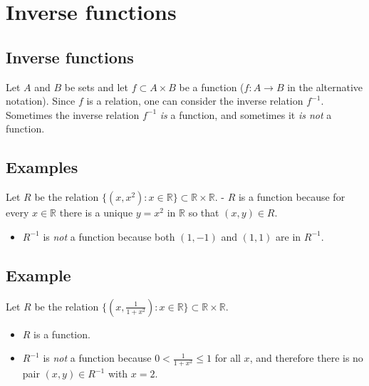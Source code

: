\documentclass[
]{article}
\author{}
\date{}
\providecommand{\tightlist}{%
  \setlength{\itemsep}{0pt}\setlength{\parskip}{0pt}}
\begin{document}
\hypertarget{inverse-functions}{%
\section{Inverse functions}\label{inverse-functions}}

\hypertarget{inverse-functions-1}{%
\subsection{Inverse functions}\label{inverse-functions-1}}

Let \(A\) and \(B\) be sets and let \(f\subset A\times B\) be a function
(\(f:A\to B\) in the alternative notation). Since \(f\) is a relation,
one can consider the inverse relation \(f^{-1}\). \vfill Sometimes the
inverse relation \(f^{-1}\) \emph{is} a function, and sometimes it
\emph{is not} a function. \vfill\eject

\hypertarget{examples}{%
\subsection{Examples}\label{examples}}

Let \(R\) be the relation
\(\{(x,x^2):x\in\mathbb{R}\}\subset\mathbb{R}\times\mathbb{R}\). \vfill
- \(R\) is a function because for every \(x\in\mathbb{R}\) there is a
unique \(y=x^2\) in \(\mathbb{R}\) so that \((x,y)\in R\).

\vfill

\begin{itemize}
\tightlist
\item
  \(R^{-1}\) is \emph{not} a function because both \((1,-1)\) and
  \((1,1)\) are in \(R^{-1}\).
\end{itemize}

\vfill\eject

\hypertarget{example}{%
\subsection{Example}\label{example}}

Let \(R\) be the relation
\(\{(x,\frac{1}{1+x^2}):x\in\mathbb{R}\}\subset\mathbb{R}\times\mathbb{R}\).

\begin{itemize}
\item
  \(R\) is a function. \vfill
\item
  \(R^{-1}\) is \emph{not} a function because \(0<\frac{1}{1+x^2}\le 1\)
  for all \(x\), and therefore there is no pair \((x,y)\in R^{-1}\) with
  \(x=2\).
\end{itemize}
\end{document}

